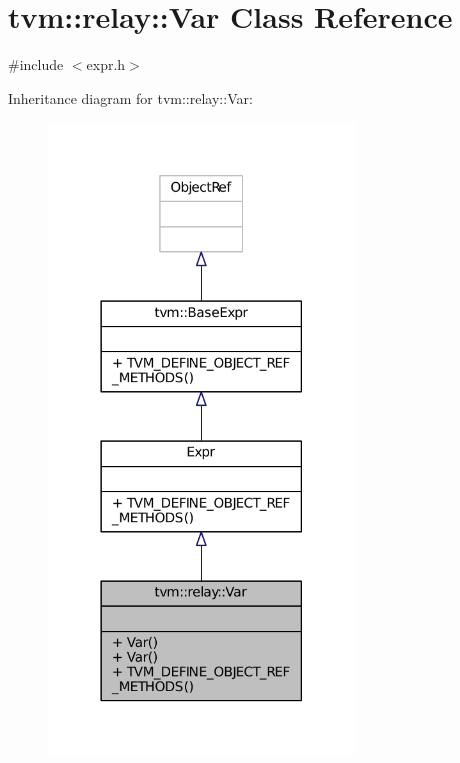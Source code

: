 \hypertarget{classtvm_1_1relay_1_1Var}{}\section{tvm\+:\+:relay\+:\+:Var Class Reference}
\label{classtvm_1_1relay_1_1Var}


{\ttfamily \#include $<$expr.\+h$>$}



Inheritance diagram for tvm\+:\+:relay\+:\+:Var\+:
\nopagebreak
\begin{figure}[H]
\begin{center}
\leavevmode
\includegraphics[width=230pt]{classtvm_1_1relay_1_1Var__inherit__graph}
\end{center}
\end{figure}


